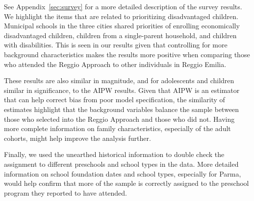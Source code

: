 See Appendix~\ref{sec:survey} for a more detailed description of the survey results. We highlight the items that are related to prioritizing disadvantaged children. Municipal schools in the three cities shared priorities of enrolling economically disadvantaged children, children from a single-parent household, and children with disabilities. This is seen in our results given that controlling for more background characteristics makes the results more positive when comparing those who attended the Reggio Approach to other individuals in Reggio Emilia. 

These results are also similar in magnitude, and for adolescents and children similar in significance, to the AIPW results. Given that AIPW is an estimator that can help correct bias from poor model specification, the similarity of estimates highlight that the background variables balance the sample between those who selected into the Reggio Approach and those who did not. Having more complete information on family characteristics, especially of the adult cohorts, might help improve the analysis further. 

Finally, we used the unearthed historical information to double check the assignment to different preschools and school types in the data. More detailed information on school foundation dates and school types, especially for Parma, would help confirm that more of the sample is correctly assigned to the preschool program they reported to have attended.


